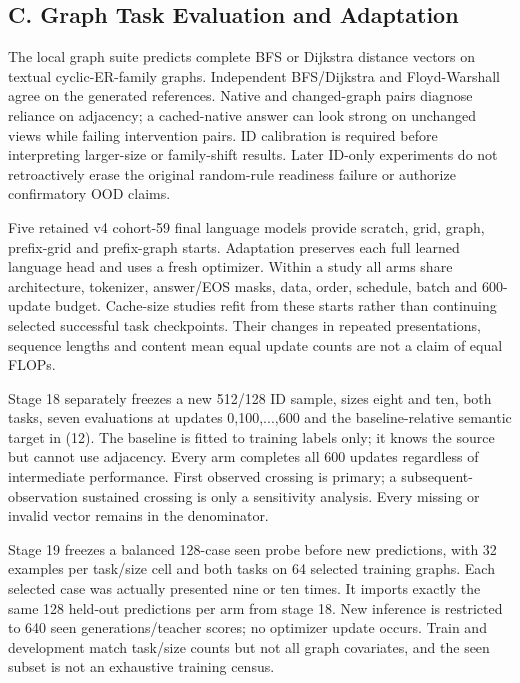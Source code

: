 \documentclass[10pt,letterpaper,twocolumn]{article}
\begin{document}
\subsection*{C. Graph Task Evaluation and Adaptation}
The local graph suite predicts complete BFS or Dijkstra distance vectors on textual cyclic-ER-family graphs. Independent BFS/\allowbreak{}Dijkstra and Floyd-Warshall agree on the generated references. Native and changed-graph pairs diagnose reliance on adjacency; a cached-native answer can look strong on unchanged views while failing intervention pairs. ID calibration is required before interpreting larger-size or family-shift results. Later ID-only experiments do not retroactively erase the original random-rule readiness failure or authorize confirmatory OOD claims.

Five retained v4 cohort-59 final language models provide scratch, grid, graph, prefix-grid and prefix-graph starts. Adaptation preserves each full learned language head and uses a fresh optimizer. Within a study all arms share architecture, tokenizer, answer/\allowbreak{}EOS masks, data, order, schedule, batch and 600-update budget. Cache-size studies refit from these starts rather than continuing selected successful task checkpoints. Their changes in repeated presentations, sequence lengths and content mean equal update counts are not a claim of equal FLOPs.

Stage 18 separately freezes a new 512/\allowbreak{}128 ID sample, sizes eight and ten, both tasks, seven evaluations at updates 0,100,...,600 and the baseline-relative semantic target in (12). The baseline is fitted to training labels only; it knows the source but cannot use adjacency. Every arm completes all 600 updates regardless of intermediate performance. First observed crossing is primary; a subsequent-observation sustained crossing is only a sensitivity analysis. Every missing or invalid vector remains in the denominator.

Stage 19 freezes a balanced 128-case seen probe before new predictions, with 32 examples per task/\allowbreak{}size cell and both tasks on 64 selected training graphs. Each selected case was actually presented nine or ten times. It imports exactly the same 128 held-out predictions per arm from stage 18. New inference is restricted to 640 seen generations/\allowbreak{}teacher scores; no optimizer update occurs. Train and development match task/\allowbreak{}size counts but not all graph covariates, and the seen subset is not an exhaustive training census.
\end{document}
